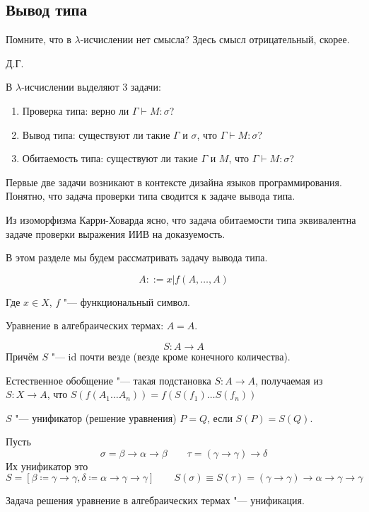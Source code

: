 \subsection{\texorpdfstring{Вывод типа}{Type deduction}}
\epigraph{Помните, что в $\lambda$-исчислении нет смысла? Здесь смысл отрицательный, скорее.}{Д.Г.}

В $\lambda$-исчислении выделяют 3 задачи:
\begin{enumerate}[label=(\asbuk*)]
    \item Проверка типа: верно ли $\Gamma \vdash M : \sigma$?
    \item Вывод типа: существуют ли такие $\Gamma$ и $\sigma$, что $\Gamma \vdash M : \sigma$?
    \item Обитаемость типа: существуют ли такие $\Gamma$ и $M$, что $\Gamma \vdash M : \sigma$?
\end{enumerate}%
Первые две задачи возникают в контексте дизайна языков программирования.
Понятно, что задача проверки типа сводится к задаче вывода типа.

Из изоморфизма Карри-Ховарда ясно, что задача обитаемости типа эквивалентна задаче проверки выражения ИИВ на доказуемость.

В этом разделе мы будем рассматривать задачу вывода типа.

\begin{definition}
    \begin{bnf}
    \[
        A ::= x | f\left(A, \ldots, A\right)
    \]
    \end{bnf}%
    Где $x \in X$, $f$ "--- функциональный символ.
\end{definition}

Уравнение в алгебраических термах: $A = A$.

\begin{definition}[$S$-подстановка]
    \[
        S : A \rightarrow A
    \]
    Причём $S$ "--- id почти везде (везде кроме конечного количества).
\end{definition}

\begin{definition}
    Естественное обобщение "--- такая подстановка $S : A \rightarrow A$, получаемая из $S : X \rightarrow A$, что
    $S\left(f\left(A_1 \dots A_n\right)\right) = f\left(S(f_1) \ldots S(f_n)\right)$
\end{definition}

\begin{definition}[унификатор] \label{unificator}
    $S$ "--- унификатор (решение уравнения) $P=Q$, если $S(P)=S(Q)$.
\end{definition}
\begin{example}
    Пусть
    \[
        \sigma = \beta\rightarrow\alpha\rightarrow\beta \qquad \tau = (\gamma\rightarrow\gamma)\rightarrow\delta
    \]
    Их унификатор это
    \[
        S = [\beta \coloneqq \gamma\rightarrow\gamma, \delta \coloneqq \alpha\rightarrow\gamma\rightarrow\gamma]
        \qquad S(\sigma) \equiv S(\tau) = (\gamma\rightarrow\gamma)\rightarrow\alpha\rightarrow\gamma\rightarrow\gamma
    \]
\end{example}
Задача решения уравнение в алгебраических термах "--- унификация.

